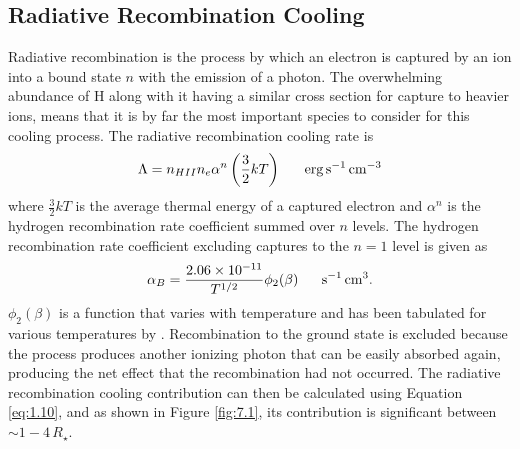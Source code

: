 \subsection{Radiative Recombination Cooling}\label{sec:7.3.2}
Radiative recombination is the process by which an electron is captured by an ion into a bound state $n$ with the emission of a photon. The overwhelming abundance of H along with it having a similar cross section for capture to heavier ions, means that it is by far the most important species to consider for this cooling process. The radiative recombination cooling rate is 
\begin{equation}
\Lambda = n_{HII}n_e  \alpha ^{n}\left(\frac{3}{2}kT\right) \ \ \ \ \ \rm{erg\,s^{-1}\,cm^{-3}}
\end{equation}
where $\frac{3}{2}kT$ is the average thermal energy of a captured electron and $\alpha ^{n}$ is the hydrogen recombination rate coefficient summed over $n$ levels. The hydrogen recombination rate coefficient excluding captures to the $n=1$ level is given as 
\begin{equation}
\alpha _{B}= \frac{2.06\times 10^{-11}}{T^{1/2}}\phi _{2}(\beta) \ \ \ \ \ \rm{s^{-1}\,cm^{3}}.
\end{equation}
$\phi _{2}(\beta)$ is a function that varies with temperature and has been tabulated for various temperatures by \citep{spitzer_1978}. Recombination to the ground state is excluded because the process produces another ionizing
photon that can be easily absorbed again, producing the net effect that the recombination had not occurred. The radiative recombination cooling contribution can then be calculated using Equation \ref{eq:1.10}, and as shown in Figure \ref{fig:7.1}, its contribution is significant between $\sim 1-4\,R_{\star}$. 

